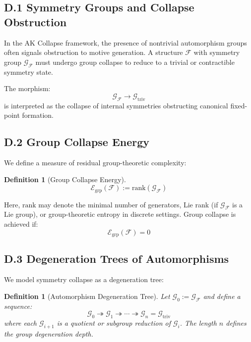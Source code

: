 \documentclass[11pt]{article}
\newtheorem{definition}[theorem]{Definition}
\begin{document}
\subsection*{D.1 Symmetry Groups and Collapse Obstruction}

In the AK Collapse framework, the presence of nontrivial automorphism groups often signals obstruction to motive generation. A structure $\mathcal{F}$ with symmetry group $\mathcal{G}_{\mathcal{F}}$ must undergo group collapse to reduce to a trivial or contractible symmetry state.

The morphism:
\[
\mathcal{G}_{\mathcal{F}} \longrightarrow \mathcal{G}_{\mathrm{triv}}
\]
is interpreted as the collapse of internal symmetries obstructing canonical fixed-point formation.

\subsection*{D.2 Group Collapse Energy}

We define a measure of residual group-theoretic complexity:

\begin{definition}[Group Collapse Energy]
\[
\mathcal{E}_{\mathrm{grp}}(\mathcal{F}) := \mathrm{rank}(\mathcal{G}_{\mathcal{F}})
\]
\end{definition}

Here, $\mathrm{rank}$ may denote the minimal number of generators, Lie rank (if $\mathcal{G}_{\mathcal{F}}$ is a Lie group), or group-theoretic entropy in discrete settings. Group collapse is achieved if:
\[
\mathcal{E}_{\mathrm{grp}}(\mathcal{F}) = 0
\]

\subsection*{D.3 Degeneration Trees of Automorphisms}

We model symmetry collapse as a degeneration tree:

\begin{definition}[Automorphism Degeneration Tree]
Let $\mathcal{G}_0 := \mathcal{G}_{\mathcal{F}}$ and define a sequence:
\[
\mathcal{G}_0 \twoheadrightarrow \mathcal{G}_1 \twoheadrightarrow \cdots \twoheadrightarrow \mathcal{G}_n = \mathcal{G}_{\mathrm{triv}}
\]
where each $\mathcal{G}_{i+1}$ is a quotient or subgroup reduction of $\mathcal{G}_i$. The length $n$ defines the group degeneration depth.
\end{definition}
\end{document}
